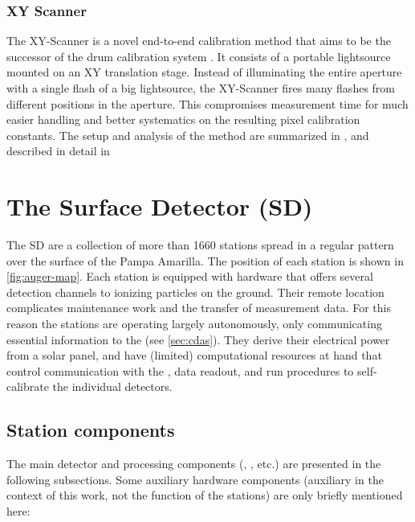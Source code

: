 \subsubsection{XY Scanner}
\label{sssec:xy-scanner}

The XY-Scanner is a novel end-to-end calibration method that aims to be the
successor of the drum calibration system \cite{engelNewEndtoendCalibration2017}.
It consists of a portable \IS lightsource mounted on an XY translation stage. 
Instead of illuminating the entire aperture with a single flash of a big 
lightsource, the XY-Scanner fires many flashes from different positions in the 
aperture. This compromises measurement time for much easier handling and better
systematics on the resulting pixel calibration constants. The setup and analysis
of the method are summarized in , and described in
detail in \cite{schaferXYScannerVersatileMethod2023}

\section{The Surface Detector (SD)}
\label{sec:sd}

The \acf{SD} are a collection of more than 1660 stations spread in a regular 
pattern over the surface of the Pampa Amarilla. The position of each station is 
shown in \cref{fig:auger-map}. Each station is equipped with hardware that 
offers several detection channels to ionizing particles on the ground. Their 
remote location complicates maintenance work and the transfer of measurement 
data. For this reason the stations are operating largely autonomously, only 
communicating essential information to the \CDAS (see \cref{sec:cdas}). They 
derive their electrical power from a solar panel, and have (limited) 
computational resources at hand that control communication with the \CDAS, data 
readout, and run procedures to self-calibrate the individual detectors. 

\subsection{Station components}
\label{ssec:station-components}

The main detector and processing components (\WCD, \UUB, etc.) are presented in
the following subsections. Some auxiliary hardware components (auxiliary in the 
context of this work, not the function of the stations) are only briefly 
mentioned here:

